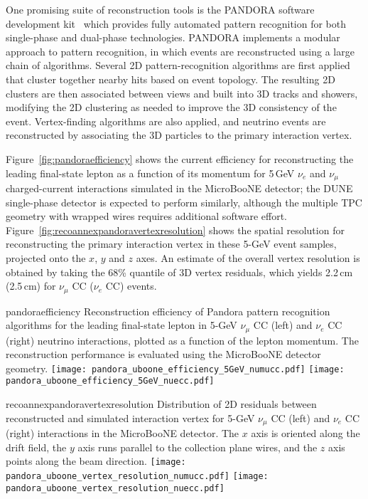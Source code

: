 One promising suite of reconstruction tools is the 
PANDORA software development kit~\cite{Marshall:2013bda,Marshall:2012hh}
which provides fully automated pattern recognition for both single-phase 
and dual-phase technologies. 
PANDORA implements a modular approach to pattern recognition,
in which events are reconstructed using a large chain of algorithms. 
Several 2D pattern-recognition algorithms are first applied
that cluster together nearby hits based on event topology.
The resulting 2D clusters are then associated between views
and built into 3D tracks and showers, modifying the 2D clustering 
as needed to improve the 3D consistency of the event. 
Vertex-finding algorithms are also applied,
and neutrino events are reconstructed by associating the 
3D particles to the primary interaction vertex.

Figure~\ref{fig:pandoraefficiency} shows the current efficiency for reconstructing
the leading final-state lepton as a function of its momentum
for 5\,GeV $\nu_{e}$ and $\nu_{\mu}$ charged-current interactions
simulated in the MicroBooNE detector; the DUNE single-phase detector is expected to 
perform similarly, although the multiple TPC geometry with wrapped wires requires
additional software effort.
Figure~\ref{fig:recoannexpandoravertexresolution} shows the spatial resolution for
reconstructing the primary interaction vertex in these 5-GeV event samples,
projected onto the $x$, $y$ and $z$ axes. An estimate of the overall vertex 
resolution is obtained by taking the 68\% quantile of 3D vertex residuals, 
which yields 2.2\,cm (2.5\,cm) for $\nu_{\mu}$ CC ($\nu_{e}$ CC) events.

\begin{cdrfigure}{pandoraefficiency}
{Reconstruction efficiency of Pandora pattern recognition algorithms
 for the leading final-state lepton in 5-GeV $\nu_{\mu}$ CC (left) and
 $\nu_{e}$ CC (right) neutrino interactions, plotted as a function of
 the lepton momentum. The reconstruction performance is evaluated
 using the MicroBooNE detector geometry. }
\texttt{[image: pandora\_uboone\_efficiency\_5GeV\_numucc.pdf]}
\texttt{[image: pandora\_uboone\_efficiency\_5GeV\_nuecc.pdf]}
\end{cdrfigure}

\begin{cdrfigure}{recoannexpandoravertexresolution}
{Distribution of 2D residuals between reconstructed and simulated interaction
 vertex for 5-GeV $\nu_{\mu}$ CC (left) and $\nu_{e}$ CC (right) interactions in the MicroBooNE detector.
 The $x$ axis is oriented along the drift field, the $y$ axis runs parallel 
 to the collection plane wires, and the $z$ axis points along the beam direction.}
\texttt{[image: pandora\_uboone\_vertex\_resolution\_numucc.pdf]}
\texttt{[image: pandora\_uboone\_vertex\_resolution\_nuecc.pdf]}
\end{cdrfigure}

